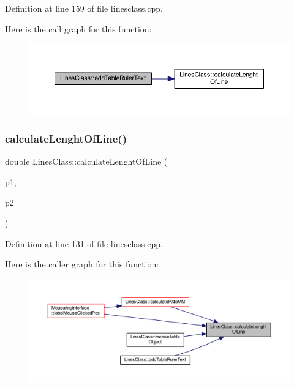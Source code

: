 Definition at line 159 of file linesclass.\+cpp.

Here is the call graph for this function\+:\nopagebreak
\begin{figure}[H]
\begin{center}
\leavevmode
\includegraphics[width=350pt]{class_lines_class_a40228921775f778a33a391bad2830d1c_cgraph}
\end{center}
\end{figure}
\mbox{\label{class_lines_class_ad8ab0bbd2b5482724948b04eba86d2f2}} 
\subsubsection{\texorpdfstring{calculateLenghtOfLine()}{calculateLenghtOfLine()}}
{\footnotesize\ttfamily double Lines\+Class\+::calculate\+Lenght\+Of\+Line (\begin{DoxyParamCaption}\item[{const Q\+Point}]{p1,  }\item[{const Q\+Point}]{p2 }\end{DoxyParamCaption})\hspace{0.3cm}{\ttfamily [static]}}



Definition at line 131 of file linesclass.\+cpp.

Here is the caller graph for this function\+:
\nopagebreak
\begin{figure}[H]
\begin{center}
\leavevmode
\includegraphics[width=350pt]{class_lines_class_ad8ab0bbd2b5482724948b04eba86d2f2_icgraph}
\end{center}
\end{figure}
\mbox{\label{class_lines_class_a7b00d7bf8c4c9b96d643c2299c52ea62}} 
